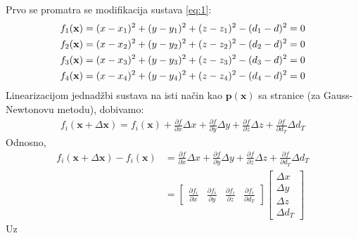 \documentclass[a4paper,twoside,12pt]{memoir} %
\begin{document}
Prvo se promatra se modifikacija sustava \ref{eq:1}:
\begin{align}\label{eq:new1}
f_1(\mathbf{x}) = (x-x_1)^{2}+(y-y_1)^{2}+(z-z_1)^{2} - (d_1-d)^2 = 0 \notag \\
f_2(\mathbf{x}) = (x-x_2)^{2}+(y-y_2)^{2}+(z-z_2)^{2} - (d_2-d)^2 = 0 \\
f_3(\mathbf{x}) = (x-x_3)^{2}+(y-y_3)^{2}+(z-z_3)^{2} - (d_3-d)^2 = 0 \notag \\
f_4(\mathbf{x}) = (x-x_4)^{2}+(y-y_4)^{2}+(z-z_4)^{2} - (d_4-d)^2 = 0 \notag
\end{align}
Linearizacijom jednadžbi sustava na isti način kao $\mathbf{p}(\mathbf{x})$ sa stranice \pageref{stranica:NGLin} (za Gauss-Newtonovu metodu), dobivamo:
\begin{align*}
f_i(\mathbf{x} + \Delta\mathbf{x}) = f_i(\mathbf{x}) + \frac{\partial f}{\partial x}\Delta x + \frac{\partial f}{\partial y}\Delta y + \frac{\partial f}{\partial z}\Delta z + \frac{\partial f}{\partial d_T}\Delta d_T 
\end{align*}
Odnosno,
\begin{align*}
f_i(\mathbf{x} + \Delta\mathbf{x}) - f_i(\mathbf{x}) &= \frac{\partial f}{\partial x}\Delta x + \frac{\partial f}{\partial y}\Delta y + \frac{\partial f}{\partial z}\Delta z + \frac{\partial f}{\partial d_T}\Delta d_T  \\ &= 
\begin{bmatrix}
\frac{\partial f_i}{\partial x} &
\frac{\partial f_i}{\partial y} &
\frac{\partial f_i}{\partial z} &
\frac{\partial f_i}{\partial d_T}
\end{bmatrix}
\begin{bmatrix}
\Delta x \\
\Delta y \\
\Delta z \\
\Delta d_T
\end{bmatrix}
\end{align*}
Uz
\end{document}
